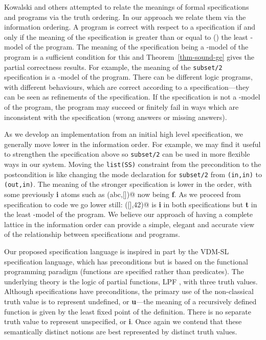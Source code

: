 \documentclass{tlp}
\begin{document}
Kowalski and others attempted to relate the meanings of formal
specifications and programs via the truth ordering.  In our approach
we relate them via the information ordering.  A program is correct
with respect to a specification if and only if the meaning of the
specification is greater than or equal to ()
the least -model of the program.  The meaning of
the specification being a -model of the program
is a sufficient condition for this and Theorem\ \ref{thm-sound-ge}
gives the partial correctness results.  For example, the meaning of
the \texttt{subset/2} specification is a -model of
the program.  There can be different logic programs, with different
behaviours, which are correct according to a specification---they can
be seen as refinements of the specification.
If the specification is not a -model of the program,
the program may succeed or finitely fail
in ways which are inconsistent with the specification (wrong answers or
missing answers).

As we develop an implementation from an initial high level specification,
we generally move lower in the information order.  For example,
we may find it useful to strengthen the specification above so
\texttt{subset/2} can be used in more flexible ways in our system.
Moving the \texttt{list(SS)} constraint from the precondition to the
postcondition is like changing the mode declaration for \texttt{subset/2}
from \texttt{(in,in)} to \texttt{(out,in)}.  The meaning of the
stronger specification is lower in the order, with some previously
\textbf{i} atoms such as \verb@subset(abc,[])@ now being \textbf{f}.  As we
proceed from specification to code we go lower still: \verb@subset([],42)@
is \textbf{i} in both specifications but \textbf{t} in the least
-model of the program.  We believe our approach of
having a complete lattice in the information order can provide a simple,
elegant and accurate view of the relationship between specifications
and programs.

Our proposed specification language is inspired in part by the VDM-SL
specification language, which has preconditions but is based on the
functional programming paradigm (functions are specified rather than
predicates).  The underlying theory is the logic of partial functions, 
LPF \cite{barringer-cheng-cbjones:1984,jones_middelburg}, 
with three truth values.  Although specifications
have preconditions, the primary use of the non-classical truth value
is to represent undefined, or \textbf{u}---the meaning of a recursively
defined function is given by the least fixed point of the definition.
There is no separate truth value to represent unspecified, or \textbf{i}.  
Once again we contend that these semantically distinct notions are 
best represented by distinct truth values.
\end{document}
